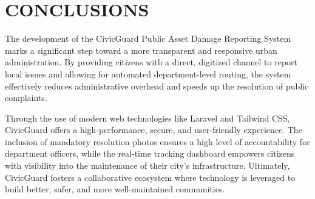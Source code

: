 \chapter{CONCLUSIONS}

The development of the CivicGuard Public Asset Damage Reporting System marks a significant step toward a more transparent and responsive urban administration. By providing citizens with a direct, digitized channel to report local issues and allowing for automated department-level routing, the system effectively reduces administrative overhead and speeds up the resolution of public complaints. 

Through the use of modern web technologies like Laravel and Tailwind CSS, CivicGuard offers a high-performance, secure, and user-friendly experience. The inclusion of mandatory resolution photos ensures a high level of accountability for department officers, while the real-time tracking dashboard empowers citizens with visibility into the maintenance of their city's infrastructure. Ultimately, CivicGuard fosters a collaborative ecosystem where technology is leveraged to build better, safer, and more well-maintained communities.
